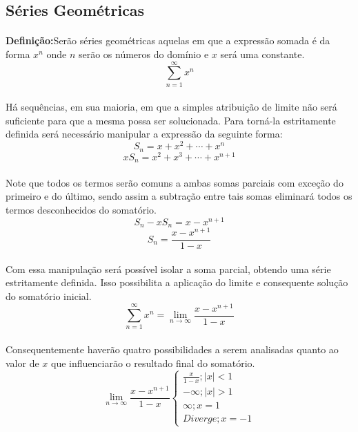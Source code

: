 \documentclass{article}
\begin{document}
    \subsection{Séries Geométricas}
        \paragraph{}\textbf{Definição:}Serão séries geométricas aquelas em que a expressão somada é da forma $x^{n}$ onde $n$ serão os números do domínio e $x$ será uma constante.
            \[\sum\limits_{n=1}^{\infty}x^n\]
        \paragraph{}Há sequências, em sua maioria, em que a simples atribuição de limite não será suficiente para que a mesma possa ser solucionada. Para torná-la estritamente definida será necessário manipular a expressão da seguinte forma:
            \[S_n=x+x^2+\cdots+x^n\]
            \[xS_n=x^2+x^3+\cdots+x^{n+1}\]
        \paragraph{}Note que todos os termos serão comuns a ambas somas parciais com exceção do primeiro e do último, sendo assim a subtração entre tais somas eliminará todos os termos desconhecidos do somatório.
            \[S_n-xS_n=x-x^{n+1}\]
            \[S_n=\frac{x-x^{n+1}}{1-x}\]
        \paragraph{}Com essa manipulação será possível isolar a soma parcial, obtendo uma série estritamente definida. Isso possibilita a aplicação do limite e consequente solução do somatório inicial.
            \[\sum\limits_{n=1}^{\infty} x^n = \lim\limits_{n\to\infty}\frac{x-x^{n+1}}{1-x}\]
        \paragraph{}Consequentemente haverão quatro possibilidades a serem analisadas quanto ao valor de $x$ que influenciarão o resultado final do somatório.
            \[\lim\limits_{n\to\infty}\frac{x-x^{n+1}}{1-x}\left \{ \begin{matrix} \frac{x}{1-x}; |x|<1\\ -\infty; |x|>1\\ \infty; x=1\\ Diverge; x=-1\end{matrix}\right.\]
        
\end{document}
